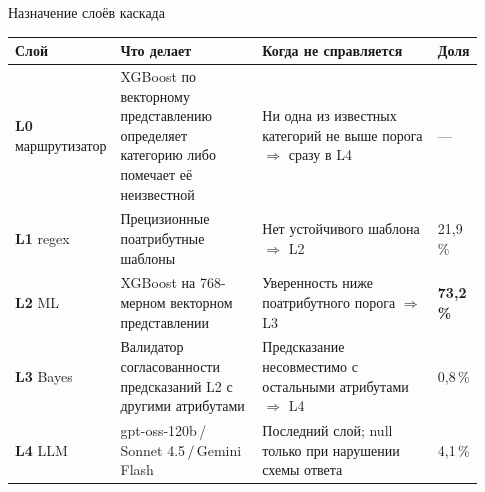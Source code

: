 \documentclass[aspectratio=169, 14pt]{beamer}
\begin{document}
\begin{frame}{Назначение слоёв каскада}

\vspace{0.3em}
\fontsize{9pt}{10.5pt}\selectfont
\setlength{\tabcolsep}{4pt}
\renewcommand{\arraystretch}{1.15}
\begin{tabular}{@{}p{0.12\linewidth} p{0.32\linewidth} p{0.42\linewidth} p{0.07\linewidth}@{}}
\toprule
\textbf{Слой} & \textbf{Что делает} & \textbf{Когда не справляется} & \textbf{Доля} \\
\midrule
\textbf{L0} маршрутизатор & XGBoost по векторному представлению определяет категорию либо помечает её неизвестной
  & Ни одна из известных категорий не выше порога $\Rightarrow$ сразу в L4 & --- \\
\textbf{L1} regex  & Прецизионные поатрибутные шаблоны
  & Нет устойчивого шаблона $\Rightarrow$ L2 & 21{,}9\,\% \\
\textbf{L2} ML     & XGBoost на 768-мерном векторном представлении
  & Уверенность ниже поатрибутного порога $\Rightarrow$ L3 & \textbf{73{,}2\,\%} \\
\textbf{L3} Bayes  & Валидатор согласованности предсказаний L2 с другими атрибутами
  & Предсказание несовместимо с остальными атрибутами $\Rightarrow$ L4 & 0{,}8\,\% \\
\textbf{L4} LLM    & gpt-oss-120b\,/\,Sonnet 4.5\,/\,Gemini Flash
  & Последний слой; null только при нарушении схемы ответа & 4{,}1\,\% \\
\bottomrule
\end{tabular}
\end{frame}
\end{document}
